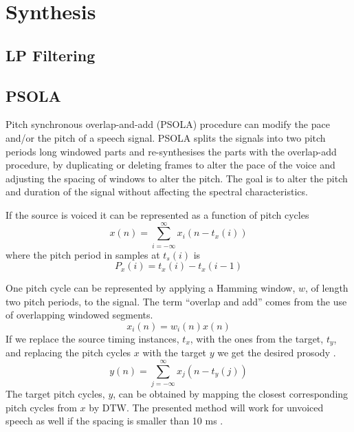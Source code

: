 

\section{Synthesis} %
\label{sec:synthesis}

\subsection{LP Filtering} %
\label{sub:lp_filtering}

\subsection{PSOLA} %
\label{sub:psola}
Pitch synchronous overlap-and-add (PSOLA) procedure can modify the pace and/or the pitch of a speech signal. PSOLA splits the signals into two pitch periods long windowed parts and re-synthesises the parts with the overlap-add procedure, by duplicating or deleting frames to alter the pace of the voice and adjusting the spacing of windows to alter the pitch. The goal is to alter the pitch and duration of the signal without affecting the spectral characteristics. 

If the source is voiced it can be represented as a function of pitch cycles
\begin{equation}
	x(n)=\sum_{i=-\infty}^{\infty}x_i(n-t_x(i))
\end{equation}
where the pitch period in samples at $t_s(i)$ is
\begin{equation}
	P_x(i)=t_x(i)-t_x(i-1)
\end{equation}

One pitch cycle can be represented by applying a Hamming window, $w$, of length two pitch periods, to the signal. The term ``overlap and add'' comes from the use of overlapping windowed segments.
\begin{equation}
	x_i(n)=w_i(n)x(n)
\end{equation}
If we replace the source timing instances, $t_x$, with the ones from the target, $t_y$, and replacing the pitch cycles $x$ with the target $y$ we get the desired prosody \cite{taletek}.
\begin{equation}
	y(n)=\sum_{j=-\infty}^{\infty}x_j(n-t_y(j)) %
\end{equation}
The target pitch cycles, $y$, can be obtained by mapping the closest corresponding pitch cycles from $x$ by \eg DTW. The presented method will work for unvoiced speech as well if the spacing is smaller than 10 ms \cite{taletek}. 
\cite{moulines95}


